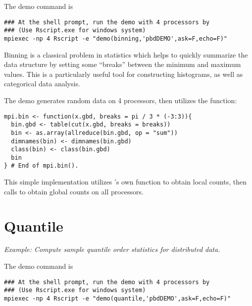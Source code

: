 The demo command is
\begin{lstlisting}
### At the shell prompt, run the demo with 4 processors by
### (Use Rscript.exe for windows system)
mpiexec -np 4 Rscript -e "demo(binning,'pbdDEMO',ask=F,echo=F)"
\end{lstlisting}

Binning is a classical problem in statistics which helps to quickly summarize
the data structure by setting some ``breaks'' between the minimum and maximum
values.
This is a particularly useful tool for constructing histograms, as well as
categorical data analysis.

The demo generates random data on 4 processors, then
utilizes the  function:
\begin{lstlisting}[language=rr,title=R Code]
mpi.bin <- function(x.gbd, breaks = pi / 3 * (-3:3)){
  bin.gbd <- table(cut(x.gbd, breaks = breaks))
  bin <- as.array(allreduce(bin.gbd, op = "sum"))
  dimnames(bin) <- dimnames(bin.gbd)
  class(bin) <- class(bin.gbd)
  bin
} # End of mpi.bin().
\end{lstlisting}
This simple implementation utilizes 's own 
function to obtain local counts, then calls
to obtain global counts on all processors.






\section[Quantile]{Quantile}%
\label{sec:quantile}

\emph{Example:  Compute sample quantile order statistics for distributed data.}

The demo command is
\begin{lstlisting}
### At the shell prompt, run the demo with 4 processors by
### (Use Rscript.exe for windows system)
mpiexec -np 4 Rscript -e "demo(quantile,'pbdDEMO',ask=F,echo=F)"
\end{lstlisting}


